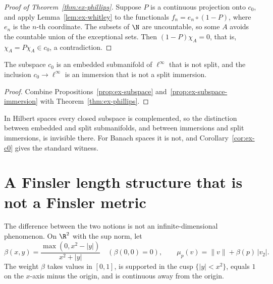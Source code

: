 \begin{proof}[Proof of Theorem~\ref{thm:ex-phillips}]
  \leanok
  Suppose $P$ is a continuous projection onto $c_0$, and apply Lemma~\ref{lem:ex-whitley} to the
  functionals $f_n = e_n \circ (1 - P)$, where $e_n$ is the $n$-th coordinate. The subsets of
  $\N$ are uncountable, so some $A$ avoids the countable union of the exceptional sets. Then
  $(1 - P)\chi_A = 0$, that is, $\chi_A = P\chi_A \in c_0$, a contradiction.
\end{proof}

\begin{corollary}
  \label{cor:ex-c0}
  \leanok
  The subspace $c_0$ is an embedded submanifold of $\ell^\infty$ that is not split, and the
  inclusion $c_0 \to \ell^\infty$ is an immersion that is not a split immersion.
\end{corollary}

\begin{proof}
  \leanok
  Combine Propositions~\ref{prop:ex-subspace} and~\ref{prop:ex-subspace-immersion} with
  Theorem~\ref{thm:ex-phillips}.
\end{proof}

\begin{remark}
  In Hilbert spaces every closed subspace is complemented, so the distinction between embedded
  and split submanifolds, and between immersions and split immersions, is invisible there. For
  Banach spaces it is not, and Corollary~\ref{cor:ex-c0} gives the standard witness.
\end{remark}

\section{A Finsler length structure that is not a Finsler metric}
\label{sec:mt-cusp}

The difference between the two notions is not an infinite-dimensional phenomenon. On $\R^2$ with
the sup norm, let
\[
  \beta(x, y) = \frac{\max(0, x^2 - |y|)}{x^2 + |y|} \quad (\beta(0,0) = 0), \qquad
  \mu_p(v) = \|v\| + \beta(p)\,|v_2| .
\]
The weight $\beta$ takes values in $[0,1]$, is supported in the cusp $\{|y| < x^2\}$, equals $1$
on the $x$-axis minus the origin, and is continuous away from the origin.

